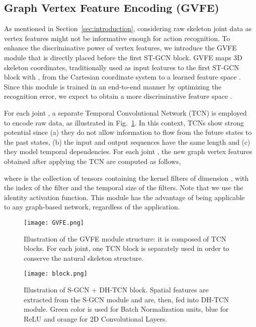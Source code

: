 \documentclass{article}
\begin{document}
\subsection{Graph Vertex Feature Encoding (GVFE)}
\label{sec:gvfe}

As mentioned in Section~\ref{sec:introduction}, considering raw skeleton joint data as vertex features might not be informative enough for action recognition. To enhance the discriminative power of vertex features, we introduce the GVFE module that is directly placed before the first ST-GCN block. GVFE maps 3D skeleton coordinates, traditionally used as input features to the first ST-GCN block  with , from the Cartesian coordinate system  to a learned feature space . Since this module is trained in an end-to-end manner by optimizing the recognition error, we expect to obtain a more discriminative feature space .


For each joint , a separate Temporal Convolutional Network (TCN) is employed to encode raw data, as illustrated in Fig.~\ref{fig:GVFE}. In this context, TCNs show strong potential since (a) they do not allow information to flow from the future states to the past states, (b) the input and output sequences have the same length and (c) they model temporal dependencies. For each joint , the new graph vertex features  obtained after applying the TCN are computed as follows,

\noindent where  is the collection of tensors containing the kernel filters 
of dimension , with  the index of the filter and  the temporal size of the filters. Note that we use the identity activation function. 
This module has the advantage of being applicable to any graph-based network, regardless of the application.



\begin{figure}[t]
\centering 
    \texttt{[image: GVFE.png]}
    \caption{Illustration of the GVFE module structure: it is composed of  TCN blocks. For each joint, one TCN block is separately used in order to conserve the natural skeleton structure.  }
    \label{fig:GVFE}
\end{figure}


\begin{figure}[t]
\centering 
    \texttt{[image: block.png]}
    \caption{Illustration of S-GCN + DH-TCN block. Spatial features are extracted from the S-GCN module and are, then, fed into DH-TCN module. Green color is used for Batch Normalization units, blue for ReLU and orange for 2D Convolutional Layers.}
    \label{fig:block}
\end{figure}
\end{document}
